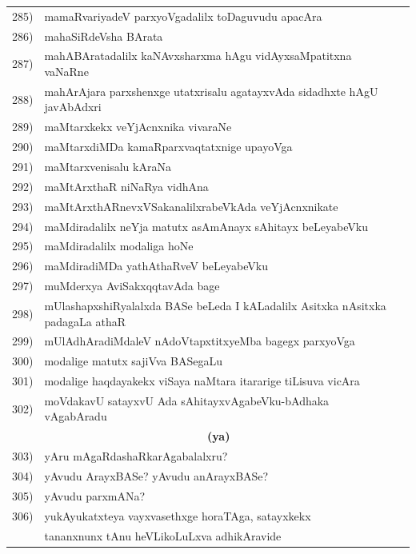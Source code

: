 {\begin{longtable}{@{}cp{7.4cm}r}
285) & mamaRvariyadeV parxyoVgadalilx toDaguvudu apacAra & \pageref{page209}\\
286) & mahaSiRdeVsha BArata & \pageref{page103}\\
287) & mahABAratadalilx kaNAvxsharxma hAgu vidAyxsaMpatitxna vaNaRne & \pageref{page57}\\
288) & mahArAjara parxshenxge utatxrisalu agatayxvAda sidadhxte hAgU javAbAdxri & \pageref{page115}\\
289) & maMtarxkekx veYjAcnxnika vivaraNe & \pageref{page115}\\ 
290) & maMtarxdiMDa kamaRparxvaqtatxnige upayoVga & \pageref{page117}\\
291) & maMtarxvenisalu kAraNa & \pageref{page120}\\
292) & maMtArxthaR niNaRya vidhAna & \pageref{page118}\\
293) & maMtArxthARnevxVSakanalilxrabeVkAda veYjAcnxnikate  & \pageref{page119}\\
294) & maMdiradalilx neYja matutx asAmAnayx sAhitayx beLeyabeVku & \pageref{page78}\\ 
295) & maMdiradalilx modaliga hoNe & \pageref{page70}\\
296) & maMdiradiMDa yathAthaRveV beLeyabeVku & \pageref{page69}\\
297) & muMderxya AviSakxqqtavAda bage & \pageref{page73}\\
298) & mUlashapxshiRyalalxda BASe beLeda I kALadalilx Asitxka nAsitxka padagaLa athaR & \pageref{page189}\\
299) & mUlAdhAradiMdaleV nAdoVtapxtitxyeMba bagegx parxyoVga & \pageref{page171}\\
300) & modalige matutx sajiVva BASegaLu & \pageref{page109}\\
301) & modalige haqdayakekx viSaya naMtara itararige tiLisuva vicAra & \pageref{page131}\\
302) & moVdakavU satayxvU Ada sAhitayxvAgabeVku-bAdhaka vAgabAradu & \pageref{page78}\\
     & \multicolumn{1}{c}{\textbf{(ya)}} & \\[0.3cm]
303) & yAru mAgaRdashaRkarAgabalalxru? & \pageref{page24}\\
304)& yAvudu ArayxBASe? yAvudu anArayxBASe? & \pageref{page174}\\
305) & yAvudu parxmANa? & \pageref{page134}\\
306) & yukAyukatxteya vayxvasethxge horaTAga, satayxkekx & \\
     & tananxnunx tAnu heVLikoLuLxva adhikAravide & \pageref{page249}\\[0.3cm]

\end{longtable}}

